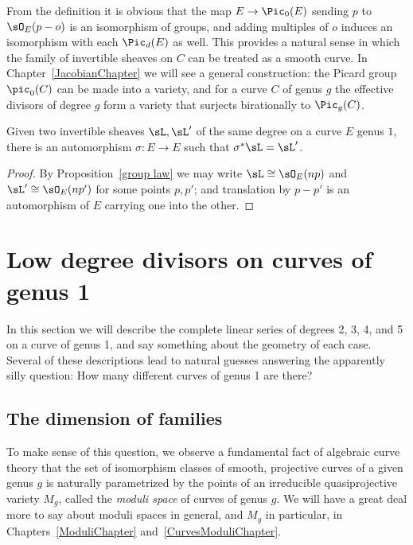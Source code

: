 \begin{remark}
From the definition it is obvious that
the map
$E \to \Pic_0(E)$ sending $p$ to $\sO_E(p-o)$ is an isomorphism of groups, and adding multiples of $o$
induces an isomorphism with each $\Pic_d(E)$ as well. This provides a natural sense
in which the family of invertible sheaves on $C$ can be treated as a smooth curve.
 In Chapter~\ref{JacobianChapter} we will see a general construction:
 the
Picard group
%
$\pic_0(C)$ can be made into
a variety, and for a curve $C$ of genus $g$ the effective divisors
of degree $g$ form a variety that surjects birationally to $\Pic_g(C)$.
\end{remark}


\begin{corollary}\label{equivalence of sheaves}
Given two invertible sheaves $\sL, \sL'$ of the same degree on a curve
%
$E$ genus $1$, there is an automorphism $\sigma: E\to E$
such that $\sigma^*\sL = \sL'$.
\end{corollary}

\begin{proof}
By Proposition~\ref{group law} we may write $\sL \cong \sO_E(np)$ and $\sL'\cong \sO_E(np')$ for some points $p,p'$; and translation by $p-p'$
is an automorphism of $E$ carrying one into the other.
\end{proof}


\section{Low degree divisors on curves of genus 1}

In this section we will describe the complete linear series of degrees
2, 3, 4, and 5 on a curve of genus 1, and say something
about the geometry of each case. Several of these descriptions lead to natural guesses answering the
apparently silly question: How many different curves of genus 1 are there?

\subsection*{The dimension of families}

To make sense of this question, we observe a fundamental fact of
algebraic curve theory that the set of isomorphism classes of smooth,
projective curves of a given genus $g$ is naturally parametrized by
the points of 
%
%
%
an irreducible
quasiprojective variety
$M_g$, called the \emph{moduli space} of curves of genus $g$. We will
have a great deal more to say about moduli spaces in general, and
$M_g$ in particular, in Chapters~\ref{ModuliChapter}
and~\ref{CurvesModuliChapter}.

